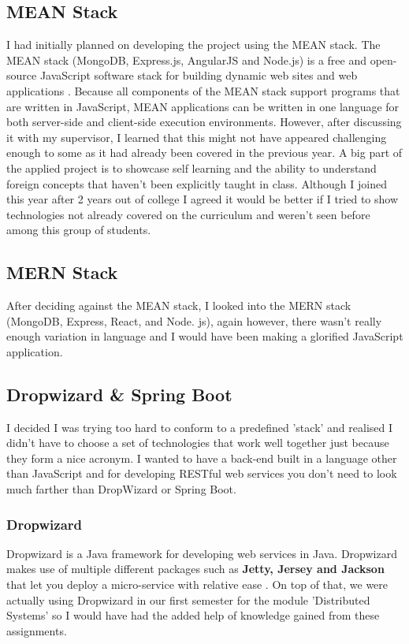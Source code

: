 \subsection{MEAN Stack}
I had initially planned on developing the project using the MEAN stack. The MEAN stack (MongoDB, Express.js, AngularJS and Node.js) is a free and open-source JavaScript software stack for building dynamic web sites and web applications \cite{mean}. Because all components of the MEAN stack support programs that are written in JavaScript, MEAN applications can be written in one language for both server-side and client-side execution environments. However, after discussing it with my supervisor, I learned that this might not have appeared challenging enough to some as it had already been covered in the previous year. A big part of the applied project is to showcase self learning and the ability to understand foreign concepts that haven't been explicitly taught in class. Although I joined this year after 2 years out of college I agreed it would be better if I tried to show technologies not already covered on the curriculum and weren't seen before among this group of students.

\subsection{MERN Stack}
After deciding against the MEAN stack, I looked into the MERN stack (MongoDB, Express, React, and Node. js), again however, there wasn't really enough variation in language and I would have been making a glorified JavaScript application.

\subsection{Dropwizard \& Spring Boot}
I decided I was trying too hard to conform to a predefined 'stack' and realised I didn't have to choose a set of technologies that work well together just because they form a nice acronym. I wanted to have a back-end built in a language other than JavaScript and for developing RESTful web services you don't need to look much farther than DropWizard or Spring Boot.

\subsubsection{Dropwizard}
Dropwizard is a Java framework for developing web services in Java. Dropwizard makes use of multiple different packages such as \textbf{Jetty, Jersey and Jackson} that let you deploy a micro-service with relative ease \cite{dropwizard}. On top of that, we were actually using Dropwizard in our first semester for the module 'Distributed Systems' so I would have had the added help of knowledge gained from these assignments.


